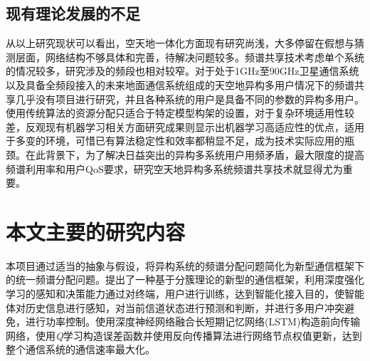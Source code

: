 \subsection{现有理论发展的不足}

从以上研究现状可以看出，空天地一体化方面现有研究尚浅，大多停留在假想与猜测层面，网络结构不够具体和完善，待解决问题较多。频谱共享技术考虑单个系统的情况较多，研究涉及的频段也相对较窄。对于处于1GHz至90GHz卫星通信系统以及具备全频段接入的未来地面通信系统组成的天空地异构多用户情况下的频谱共享几乎没有项目进行研究，并且各种系统的用户是具备不同的参数的异构多用户。使用传统算法的资源分配只适合于特定模型构架的设置，对于复杂环境适用性较差，反观现有机器学习相关方面研究成果则显示出机器学习高适应性的优点，适用于多变的环境，可惜已有算法稳定性和效率都稍显不足，成为技术实际应用的瓶颈。在此背景下，为了解决日益突出的异构多系统用户用频矛盾，最大限度的提高频谱利用率和用户QoS要求，研究空天地异构多系统频谱共享技术就显得尤为重要。

\section{本文主要的研究内容}

本项目通过适当的抽象与假设，将异构系统的频谱分配问题简化为新型通信框架下的统一频谱分配问题。提出了一种基于分簇理论的新型的通信框架，利用深度强化学习的感知和决策能力通过对终端，用户进行训练，达到智能化接入目的，使智能体对历史信息进行感知，对当前信道状态进行预测和判断，并进行多用户冲突避免，进行功率控制。使用深度神经网络融合长短期记忆网络(LSTM)构造前向传输网络，使用\textit{Q}学习构造误差函数并使用反向传播算法进行网络节点权值更新，达到整个通信系统的通信速率最大化。